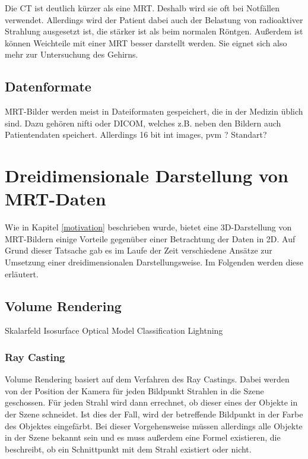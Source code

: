 Die CT ist deutlich kürzer als eine MRT. Deshalb wird sie oft bei Notfällen verwendet. Allerdings wird der Patient dabei auch der Belastung von radioaktiver Strahlung ausgesetzt ist, die stärker ist als beim normalen Röntgen. Außerdem ist können Weichteile mit einer MRT besser darstellt werden. Sie eignet sich also mehr zur Untersuchung des Gehirns.


\subsection{Datenformate}

MRT-Bilder werden meist in Dateiformaten gespeichert, die in der Medizin üblich sind. Dazu gehören nifti oder DICOM, welches z.B. neben den Bildern auch Patientendaten speichert.
Allerdings 
16 bit int images, pvm ? Standart?
\section{Dreidimensionale Darstellung von MRT-Daten}		 %
Wie in Kapitel \ref{motivation} beschrieben wurde, bietet eine 3D-Darstellung von MRT-Bildern einige Vorteile gegenüber einer Betrachtung der Daten in 2D. 
Auf Grund dieser Tatsache gab es im Laufe der Zeit verschiedene Ansätze zur Umsetzung einer dreidimensionalen Darstellungsweise. 
Im Folgenden werden diese erläutert. 


\subsection{Volume Rendering}

Skalarfeld 
Isosurface
Optical Model
Classification
Lightning


\subsubsection{Ray Casting}

Volume Rendering basiert auf dem Verfahren des Ray Castings. 
Dabei werden von der Position der Kamera für jeden Bildpunkt Strahlen in die Szene geschossen. Für jeden Strahl wird dann errechnet, ob dieser eines der Objekte in der Szene schneidet. Ist dies der Fall, wird der betreffende Bildpunkt in der Farbe des Objektes eingefärbt. 
Bei dieser Vorgehensweise müssen allerdings alle Objekte in der Szene bekannt sein und es muss außerdem eine Formel existieren, die beschreibt, ob ein Schnittpunkt mit dem Strahl existiert oder nicht. 

